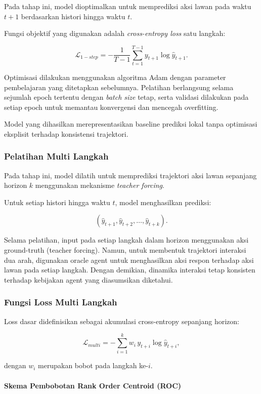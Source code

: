 Pada tahap ini, model dioptimalkan untuk memprediksi aksi lawan pada waktu $t+1$ berdasarkan histori hingga waktu $t$.

Fungsi objektif yang digunakan adalah \textit{cross-entropy loss} satu langkah:

\[
\mathcal{L}_{1-step}
=
-
\frac{1}{T-1}
\sum_{t=1}^{T-1}
y_{t+1} \log \hat{y}_{t+1}.
\]

Optimisasi dilakukan menggunakan algoritma Adam dengan parameter pembelajaran yang ditetapkan sebelumnya. Pelatihan berlangsung selama sejumlah epoch tertentu dengan \textit{batch size} tetap, serta validasi dilakukan pada setiap epoch untuk memantau konvergensi dan mencegah overfitting.

Model yang dihasilkan merepresentasikan baseline prediksi lokal tanpa optimisasi eksplisit terhadap konsistensi trajektori.

\subsubsection{Pelatihan Multi Langkah}

Pada tahap ini, model dilatih untuk memprediksi trajektori aksi lawan sepanjang horizon $k$ menggunakan mekanisme \textit{teacher forcing}. 

Untuk setiap histori hingga waktu $t$, model menghasilkan prediksi:

\[
(\hat{y}_{t+1}, \hat{y}_{t+2}, \dots, \hat{y}_{t+k}).
\]

Selama pelatihan, input pada setiap langkah dalam horizon menggunakan aksi ground-truth (teacher forcing). Namun, untuk membentuk trajektori interaksi dua arah, digunakan oracle agent untuk menghasilkan aksi respon terhadap aksi lawan pada setiap langkah. Dengan demikian, dinamika interaksi tetap konsisten terhadap kebijakan agent yang diasumsikan diketahui.

\subsubsection{Fungsi Loss Multi Langkah}

Loss dasar didefinisikan sebagai akumulasi cross-entropy sepanjang horizon:

\[
\mathcal{L}_{multi}
=
-
\sum_{i=1}^{k}
w_i \,
y_{t+i}
\log
\hat{y}_{t+i},
\]

dengan $w_i$ merupakan bobot pada langkah ke-$i$.

\paragraph{Skema Pembobotan Rank Order Centroid (ROC)}

